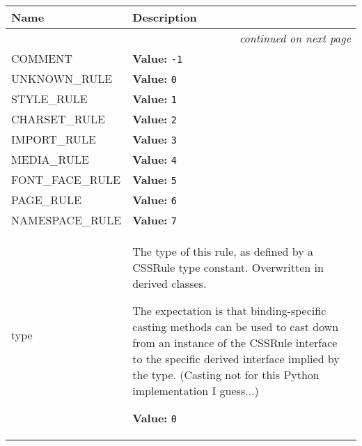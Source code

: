     \vspace{-1cm}
\hspace{\varindent}\begin{longtable}{|p{\varnamewidth}|p{\vardescrwidth}|l}
\cline{1-2}
\cline{1-2} \centering \textbf{Name} & \centering \textbf{Description}& \\
\cline{1-2}
\endhead\cline{1-2}\multicolumn{3}{r}{\small\textit{continued on next page}}\\\endfoot\cline{1-2}
\endlastfoot\raggedright C\-O\-M\-M\-E\-N\-T\- & \raggedright \textbf{Value:} 
{\tt -1}&\\
\cline{1-2}
\raggedright U\-N\-K\-N\-O\-W\-N\-\_\-R\-U\-L\-E\- & \raggedright \textbf{Value:} 
{\tt 0}&\\
\cline{1-2}
\raggedright S\-T\-Y\-L\-E\-\_\-R\-U\-L\-E\- & \raggedright \textbf{Value:} 
{\tt 1}&\\
\cline{1-2}
\raggedright C\-H\-A\-R\-S\-E\-T\-\_\-R\-U\-L\-E\- & \raggedright \textbf{Value:} 
{\tt 2}&\\
\cline{1-2}
\raggedright I\-M\-P\-O\-R\-T\-\_\-R\-U\-L\-E\- & \raggedright \textbf{Value:} 
{\tt 3}&\\
\cline{1-2}
\raggedright M\-E\-D\-I\-A\-\_\-R\-U\-L\-E\- & \raggedright \textbf{Value:} 
{\tt 4}&\\
\cline{1-2}
\raggedright F\-O\-N\-T\-\_\-F\-A\-C\-E\-\_\-R\-U\-L\-E\- & \raggedright \textbf{Value:} 
{\tt 5}&\\
\cline{1-2}
\raggedright P\-A\-G\-E\-\_\-R\-U\-L\-E\- & \raggedright \textbf{Value:} 
{\tt 6}&\\
\cline{1-2}
\raggedright N\-A\-M\-E\-S\-P\-A\-C\-E\-\_\-R\-U\-L\-E\- & \raggedright \textbf{Value:} 
{\tt 7}&\\
\cline{1-2}
\raggedright t\-y\-p\-e\- & \raggedright The type of this rule, as defined by a CSSRule type constant.
Overwritten in derived classes.

The expectation is that binding-specific casting methods can be used to
cast down from an instance of the CSSRule interface to the specific
derived interface implied by the type.
(Casting not for this Python implementation I guess...)

\textbf{Value:} 
{\tt 0}&\\
\cline{1-2}
\end{longtable}

